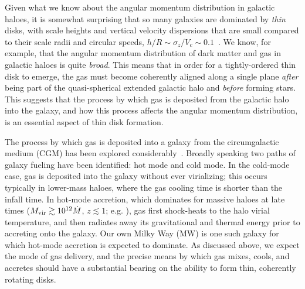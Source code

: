 \documentclass[fleqn,usenatbib]{mnras}
\newcommand{\Mdot}{\dot{M}}
\begin{document}
Given what we know about the angular momentum distribution in galactic haloes, it is somewhat surprising that so many galaxies are dominated by {\em thin} disks, with  scale heights and vertical velocity dispersions that are small compared to their scale radii and circular speeds, $h/R \sim \sigma_z/V_c \sim 0.1$~\citep[][]{Kregel2002}.
We know, for example, that the angular momentum distribution of dark matter \citep{Bullock2001,Lian2018} and gas \citep{Stewart2013,DeFelippis2020} in galactic haloes is quite \textit{broad}.
This means that in order for a tightly-ordered thin disk to emerge, the gas must become coherently aligned along a single plane \textit{after} being part of the quasi-spherical extended galactic halo and \textit{before} forming stars.
This suggests that the process by which gas is deposited from the galactic halo into the galaxy, and how this process affects the angular momentum distribution, is an essential aspect of thin disk formation.

The process by which gas is deposited into a galaxy from the circumgalactic medium (CGM) has been explored considerably~\citep[e.g.][]{Keres2005, Keres2009a, Dekel2006, Faucher-Giguere2011a, VanDeVoort2011a, Angles-Alcazar2017, Martin2019a}.
Broadly speaking two paths of galaxy fueling have been identified: hot mode and cold mode.
In the cold-mode case, gas is deposited into the galaxy without ever virializing; this occurs typically in lower-mass haloes, where the gas cooling time is shorter than the infall time.
In hot-mode accretion, which dominates for massive haloes at late times ($M_{\rm vir} \gtrsim 10^{12} \Mdot$, $z \lesssim 1$; e.g. \citealt{Faucher-Giguere2011a, VandeVoort2011, VandeVoort2012a, Joung2012, Murante2012, Nelson2013, Fielding2017}), gas first shock-heats to the halo virial temperature, and then radiates away its gravitational and thermal energy prior to accreting onto the galaxy.
Our own Milky Way (MW) is one such galaxy for which hot-mode accretion is expected to dominate.
As discussed above, we expect the mode of gas delivery, and the precise means by which gas mixes, cools, and accretes should have a substantial bearing on the ability to form thin, coherently rotating disks.
\end{document}
